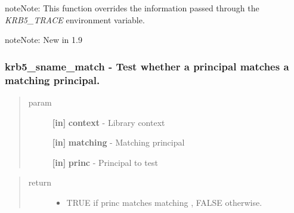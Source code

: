 \documentclass[letterpaper,10pt,english]{sphinxmanual}
\begin{document}
\begin{notice}{note}{Note:}
This function overrides the information passed through the \emph{KRB5\_TRACE} environment variable.
\end{notice}

\begin{notice}{note}{Note:}
New in 1.9
\end{notice}


\subsubsection{krb5\_sname\_match -  Test whether a principal matches a matching principal.}
\label{appdev/refs/api/krb5_sname_match::doc}\label{appdev/refs/api/krb5_sname_match:krb5-sname-match-test-whether-a-principal-matches-a-matching-principal}

\begin{fulllineitems}
\label{appdev/refs/api/krb5_sname_match:c.krb5_sname_match}
\end{fulllineitems}

\begin{quote}\begin{description}
\item[{param}] \leavevmode
\textbf{{[}in{]}} \textbf{context} - Library context

\textbf{{[}in{]}} \textbf{matching} - Matching principal

\textbf{{[}in{]}} \textbf{princ} - Principal to test

\end{description}\end{quote}
\begin{quote}\begin{description}
\item[{return}] \leavevmode\begin{itemize}
\item {} 
TRUE if princ matches matching , FALSE otherwise.

\end{itemize}

\end{description}\end{quote}
\end{document}

